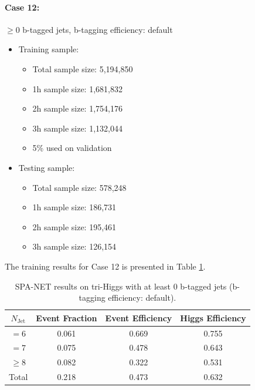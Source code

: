 \documentclass[12pt]{article}
\begin{document}
		\paragraph{Case 12:} $\ge 0$ b-tagged jets, b-tagging efficiency: default
		\begin{itemize}
			\item Training sample:
			\begin{itemize}
				\item Total sample size: 5,194,850
				\item 1h sample size: 1,681,832
				\item 2h sample size: 1,754,176
				\item 3h sample size: 1,132,044
				\item 5\% used on validation
			\end{itemize}
			\item Testing sample: 
				\begin{itemize}
					\item Total sample size: 578,248
					\item 1h sample size: 186,731
					\item 2h sample size: 195,461
					\item 3h sample size: 126,154
				\end{itemize}
		\end{itemize}
		The training results for Case 12 is presented in Table \ref{tab:SPANet_triHiggs_0btag_default_10M}.
		\begin{table}[htpb]
			\centering
			\caption{SPA-NET results on tri-Higgs with at least 0 b-tagged jets (b-tagging efficiency: default).}
			\label{tab:SPANet_triHiggs_0btag_default_10M}
			\begin{tabular}{c|c|cc}
				$N_\text{Jet}$ & Event Fraction & Event Efficiency & Higgs Efficiency \\
				\hline
				$=6$	  &   0.061             &    0.669              &    0.755             \\
				$=7$	  &   0.075             &    0.478              &    0.643             \\
				$\ge 8$	  &   0.082             &    0.322              &    0.531             \\
				Total	  &   0.218             &    0.473              &    0.632             \\
			\end{tabular}
		\end{table}
\end{document}
